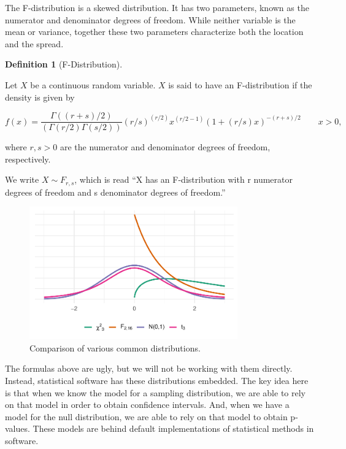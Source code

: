 \documentclass[
  letterpaper,
  DIV=11,
  numbers=noendperiod]{scrreprt}
\theoremstyle{definition}
\newtheorem{definition}{Definition}[chapter]
\theoremstyle{definition}
\theoremstyle{remark}
\begin{document}
The F-distribution is a skewed distribution. It has two parameters,
known as the numerator and denominator degrees of freedom. While neither
variable is the mean or variance, together these two parameters
characterize both the location and the spread.

\begin{definition}[F-Distribution]\protect\hypertarget{def-f-distribution}{}\label{def-f-distribution}

Let \(X\) be a continuous random variable. \(X\) is said to have an
F-distribution if the density is given by

\[f(x) = \frac{\Gamma((r + s)/2)}{(\Gamma(r/2) \Gamma(s/2))} (r/s)^{(r/2)} x^{(r/2 - 1)} (1 + (r/s) x)^{-(r + s)/2} \qquad x > 0,\]

where \(r,s > 0\) are the numerator and denominator degrees of freedom,
respectively.

We write \(X \sim F_{r, s}\), which is read ``X has an F-distribution
with r numerator degrees of freedom and s denominator degrees of
freedom.''

\end{definition}

\begin{figure}

{\centering \includegraphics[width=0.8\textwidth,height=\textheight]{./images/fig-essential-probability-comparisons-1.pdf}

}

\caption{\label{fig-essential-probability-comparisons}Comparison of
various common distributions.}

\end{figure}

The formulas above are ugly, but we will not be working with them
directly. Instead, statistical software has these distributions
embedded. The key idea here is that when we know the model for a
sampling distribution, we are able to rely on that model in order to
obtain confidence intervals. And, when we have a model for the null
distribution, we are able to rely on that model to obtain p-values.
These models are behind default implementations of statistical methods
in software.
\end{document}
